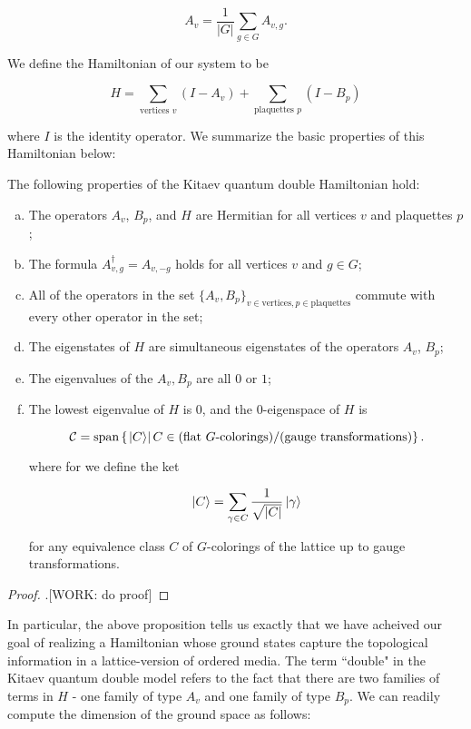 $$A_v=\frac{1}{|G|}\sum_{g\in G}A_{v,g}.$$

We define the Hamiltonian of our system to be

$$H=\sum_{\text{vertices $v$}}(I-A_v)+\sum_{\text{plaquettes $p$}}(I-B_p)$$

where $I$ is the identity operator. We summarize the basic properties of this Hamiltonian below:

\begin{proposition} The following properties of the Kitaev quantum double Hamiltonian hold:

\begin{enumerate}[(a)]
\item The operators $A_v$, $B_p$, and $H$ are Hermitian for all vertices $v$ and plaquettes $p$;
\item The formula $A_{v,g}^{\dagger}=A_{v,-g}$ holds for all vertices $v$ and $g\in G$;
\item All of the operators in the set $\{A_v,B_p\}_{v\in \text{vertices}, p\in \text{plaquettes}}$ commute with every other operator in the set;
\item The eigenstates of $H$ are simultaneous eigenstates of the operators $A_v$, $B_p$;
\item The eigenvalues of the $A_v,B_p$ are all $0$ or $1$;
\item The lowest eigenvalue of $H$ is $0$, and the $0$-eigenspace of $H$ is

$$\mathcal{C}=\text{span}\left\{\left.\ket{C}\right| C\in \text{(flat $G$-colorings)}/\text{(gauge transformations)}\right\}.$$

where for we define the ket

$$\ket{C}=\sum_{\gamma \in C}\frac{1}{\sqrt{|C|}}\ket{\gamma}$$

for any equivalence class $C$ of $G$-colorings of the lattice up to gauge transformations.

\end{enumerate}
\end{proposition}
\begin{proof}.[WORK: do proof]
\end{proof}

In particular, the above proposition tells us exactly that we have acheived our goal of realizing a Hamiltonian whose ground states capture the topological information in a lattice-version of ordered media.  The term ``double" in the Kitaev quantum double model refers to the fact that there are two families of terms in $H$ - one family of type $A_v$ and one family of type $B_p$. We can readily compute the dimension of the ground space as follows:

